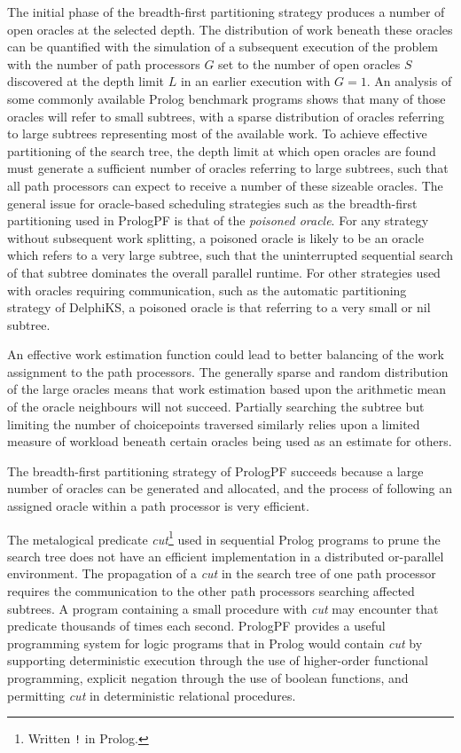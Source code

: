 The initial phase of the breadth-first partitioning strategy produces
a number of open oracles at the selected depth.  The distribution of
work beneath these oracles can be quantified with the simulation of 
a subsequent execution of the problem with the number of path processors
$G$ set to the number of open oracles $S$ discovered at the depth limit
$L$ in an earlier execution with $G=1$.
An analysis of some commonly available Prolog benchmark programs shows
that many of those oracles will refer to small subtrees, with
a sparse distribution of oracles referring to large subtrees
representing most of the available work.
To achieve effective partitioning of the search tree, the depth limit
at which open oracles are found must generate a sufficient number of
oracles referring to large subtrees, such that all path processors can
expect to receive a number of these sizeable oracles.  The general
issue for oracle-based scheduling strategies such as the 
breadth-first partitioning used in PrologPF is that of the
\textit{poisoned oracle}.  For any strategy without subsequent work
splitting, a poisoned oracle is likely to be an oracle which refers
to a very large subtree, such that the uninterrupted sequential search of
that subtree dominates the overall parallel runtime.  For other
strategies used with oracles requiring communication, 
such as the automatic partitioning strategy of DelphiKS, a poisoned oracle
is that referring to a very small or nil subtree.

An effective work estimation function could lead to better balancing of
the work assignment to the path processors.  The generally sparse
and random distribution of the large oracles means that work estimation
based upon the arithmetic mean of the oracle neighbours will not
succeed.  Partially searching the subtree but limiting the number of
choicepoints traversed similarly relies upon a limited measure of
workload beneath certain oracles being used as an estimate for others.

The breadth-first partitioning strategy of PrologPF succeeds because
a large number of oracles can be generated and allocated, and the
process of following an assigned oracle within a path processor is
very efficient.

The metalogical predicate \textit{cut}\footnote{Written \texttt{!} in Prolog.}
 used in sequential Prolog programs to
prune the search tree does not have an efficient implementation in a
distributed or-parallel environment.  The propagation of a \textit{cut} in the search
tree of one path processor requires the communication to the other path
processors searching affected subtrees.  A program containing a small procedure
with \textit{cut} may encounter that predicate thousands of times each second.
PrologPF provides a useful programming system for logic programs that in Prolog
would contain \textit{cut} by supporting deterministic execution through the
use of higher-order functional programming, explicit negation through the use
of boolean functions, and permitting \textit{cut} in deterministic relational
procedures.

